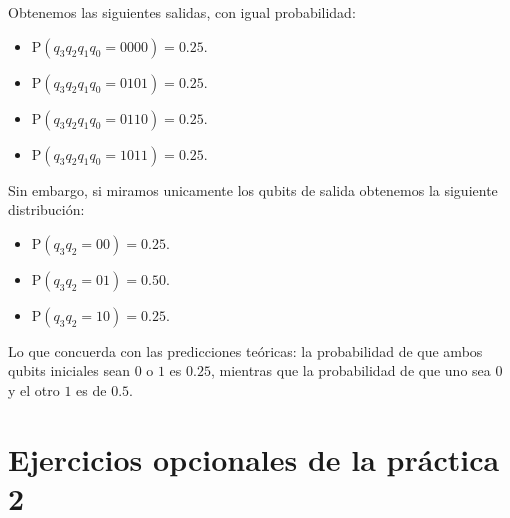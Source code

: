 \documentclass[11pt]{article}
\theoremstyle{plain}
\begin{document}
Obtenemos las siguientes salidas, con igual probabilidad:

\begin{itemize}
	\item P$(q_3q_2q_1q_0 = 0000) = 0.25$.
	\item P$(q_3q_2q_1q_0 = 0101) = 0.25$.
	\item P$(q_3q_2q_1q_0 = 0110) = 0.25$.
	\item P$(q_3q_2q_1q_0 = 1011) = 0.25$.
\end{itemize}

Sin embargo, si miramos unicamente los qubits de salida obtenemos la siguiente distribución:

\begin{itemize}
	\item P$(q_3q_2 = 00) = 0.25$.
	\item P$(q_3q_2 = 01) = 0.50$.
	\item P$(q_3q_2 = 10) = 0.25$.
\end{itemize}

Lo que concuerda con las predicciones teóricas: la probabilidad de que ambos qubits iniciales sean $0$ o $1$ es $0.25$, mientras que la probabilidad de que uno sea $0$ y el otro $1$ es de $0.5$.

\section{Ejercicios opcionales de la práctica 2}
\end{document}
